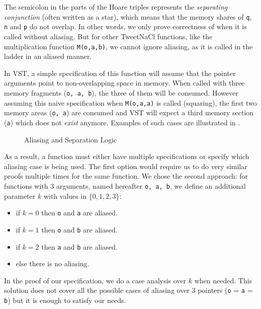
The semicolon in the  parts of the Hoare triples represents the \emph{separating conjunction} (often written as a star), which means that
the memory shares of \texttt{q}, \texttt{n} and \texttt{p} do not overlap.
In other words,
we only prove correctness of  when it is called without aliasing.
But for other TweetNaCl functions, like the multiplication function \texttt{M(o,a,b)}, we cannot ignore aliasing, as it is called in the ladder in an aliased manner.

In VST, a simple specification of this function will assume that the pointer arguments
point to non-overlapping space in memory.
When called with three memory fragments (\texttt{o, a, b}),
the three of them will be consumed. However assuming this naive specification
when \texttt{M(o,a,a)} is called (squaring), the first two memory areas (\texttt{o, a})
are consumed and VST will expect a third memory section (\texttt{a}) which does not \emph{exist} anymore.
Examples of such cases are illustrated in .
\begin{figure}[h]%
      \centering%
      \caption{Aliasing and Separation Logic}%
      \label{tikz:MemSame}%
\end{figure}
As a result, a function must either have multiple specifications or specify which
aliasing case is being used.
The first option would require us to do very similar proofs multiple times for the same function.
We chose the second approach: for functions with 3 arguments, named hereafter \texttt{o, a, b},
we define an additional parameter $k$ with values in $\{0,1,2,3\}$:
\begin{itemize}
      \item if $k=0$ then \texttt{o} and \texttt{a} are aliased.
      \item if $k=1$ then \texttt{o} and \texttt{b} are aliased.
      \item if $k=2$ then \texttt{a} and \texttt{b} are aliased.
      \item else there is no aliasing.
\end{itemize}
In the proof of our specification, we do a case analysis over $k$ when needed.
This solution does not cover all the possible cases of aliasing over 3 pointers
(\eg \texttt{o} = \texttt{a} = \texttt{b}) but it is enough to satisfy our needs.

